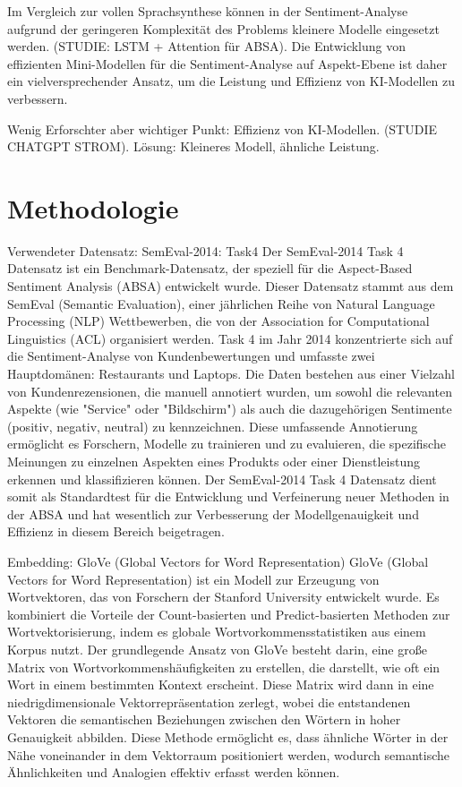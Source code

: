 \documentclass[12pt]{article}
\begin{document}
Im Vergleich zur vollen Sprachsynthese können in der Sentiment-Analyse aufgrund der geringeren Komplexität des Problems kleinere Modelle eingesetzt werden. 
(STUDIE: LSTM + Attention für ABSA). Die Entwicklung von effizienten Mini-Modellen für die Sentiment-Analyse auf Aspekt-Ebene ist daher ein vielversprechender Ansatz,
um die Leistung und Effizienz von KI-Modellen zu verbessern.

Wenig Erforschter aber wichtiger Punkt: Effizienz von KI-Modellen. (STUDIE CHATGPT STROM). Lösung: Kleineres Modell, ähnliche Leistung.
\section{Methodologie}

Verwendeter Datensatz: SemEval-2014: Task4
Der SemEval-2014 Task 4 Datensatz ist ein Benchmark-Datensatz, der speziell für die Aspect-Based Sentiment Analysis (ABSA) entwickelt wurde. Dieser Datensatz stammt aus dem SemEval (Semantic Evaluation), einer jährlichen Reihe von Natural Language Processing (NLP) Wettbewerben, die von der Association for Computational Linguistics (ACL) organisiert werden. Task 4 im Jahr 2014 konzentrierte sich auf die Sentiment-Analyse von Kundenbewertungen und umfasste zwei Hauptdomänen: Restaurants und Laptops. Die Daten bestehen aus einer Vielzahl von Kundenrezensionen, die manuell annotiert wurden, um sowohl die relevanten Aspekte (wie "Service" oder "Bildschirm") als auch die dazugehörigen Sentimente (positiv, negativ, neutral) zu kennzeichnen. Diese umfassende Annotierung ermöglicht es Forschern, Modelle zu trainieren und zu evaluieren, die spezifische Meinungen zu einzelnen Aspekten eines Produkts oder einer Dienstleistung erkennen und klassifizieren können. Der SemEval-2014 Task 4 Datensatz dient somit als Standardtest für die Entwicklung und Verfeinerung neuer Methoden in der ABSA und hat wesentlich zur Verbesserung der Modellgenauigkeit und Effizienz in diesem Bereich beigetragen.

Embedding: GloVe (Global Vectors for Word Representation)
GloVe (Global Vectors for Word Representation) ist ein Modell zur Erzeugung von Wortvektoren, das von Forschern der Stanford University entwickelt wurde. Es kombiniert die Vorteile der Count-basierten und Predict-basierten Methoden zur Wortvektorisierung, indem es globale Wortvorkommensstatistiken aus einem Korpus nutzt. Der grundlegende Ansatz von GloVe besteht darin, eine große Matrix von Wortvorkommenshäufigkeiten zu erstellen, die darstellt, wie oft ein Wort in einem bestimmten Kontext erscheint. Diese Matrix wird dann in eine niedrigdimensionale Vektorrepräsentation zerlegt, wobei die entstandenen Vektoren die semantischen Beziehungen zwischen den Wörtern in hoher Genauigkeit abbilden. Diese Methode ermöglicht es, dass ähnliche Wörter in der Nähe voneinander in dem Vektorraum positioniert werden, wodurch semantische Ähnlichkeiten und Analogien effektiv erfasst werden können.
\end{document}

